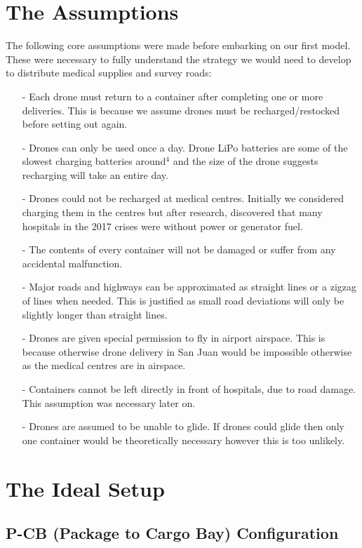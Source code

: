 \documentclass[a4paper,12pt]{article}
\begin{document}
\section{The Assumptions}
The following core assumptions were made before embarking on our first model. These were necessary to fully understand the strategy we would
need to develop to distribute medical supplies and survey roads:

\begin{itemize}
\item[-]Each drone must return to a container after completing one or more deliveries.
        This is because we assume drones must be recharged/restocked before setting out again.
\item[-]Drones can only be used once a day. Drone LiPo batteries are some of the slowest charging batteries around$^{4}$ and
        the size of the drone suggests recharging will take an entire day.
\item[-]Drones could not be recharged at medical centres.
        Initially we considered charging them in the centres but after research, discovered that
        many hospitals in the 2017 crises were without power or generator fuel.
\item[-]The contents of every container will not be damaged or suffer from any accidental malfunction.
\item[-]Major roads and highways can be approximated as straight lines or a zigzag of lines when needed. This is justified as small road deviations will only be slightly longer than straight lines.
\item[-]Drones are given special permission to fly in airport airspace. This is because otherwise drone delivery in San Juan would be impossible otherwise as the medical centres are in airspace.
\item[-]Containers cannot be left directly in front of hospitals, due to road damage. This assumption was necessary later on.
\item[-]Drones are assumed to be unable to glide. If drones could glide then only one container would be theoretically necessary however this is too unlikely.
\end{itemize}

\section{The Ideal Setup}

\subsection{P-CB (Package to Cargo Bay) Configuration}
\end{document}
